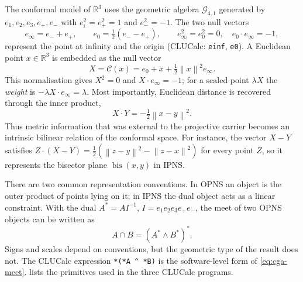 \documentclass[11pt,a4paper]{article}
\theoremstyle{plain}
\theoremstyle{definition}
\theoremstyle{remark}
\newcommand{\R}{\mathbb{R}}
\newcommand{\GA}{\mathcal{G}_{4,1}}
\newcommand{\einf}{e_{\infty}}
\newcommand{\ezero}{e_{0}}
\newcommand{\norm}[1]{\left\lVert#1\right\rVert}
\newcommand{\bis}{\operatorname{bis}}
\begin{document}
The conformal model of $\R^3$ uses the geometric algebra $\GA$ generated by
$e_1,e_2,e_3,e_{+},e_{-}$ with $e_i^2=e_{+}^2=1$ and $e_{-}^2=-1$. The two null
vectors
\begin{equation}
  \einf=e_{-}+e_{+},\qquad \ezero=\tfrac12(e_{-}-e_{+}),
  \qquad
  \einf^2=\ezero^2=0,\quad \ezero\cdot\einf=-1,
\end{equation}
represent the point at infinity and the origin (CLUCalc: \texttt{einf},
\texttt{e0}). A Euclidean point $x\in\R^3$ is embedded as the null vector
\begin{equation}
  X=\mathcal{C}(x)=\ezero+x+\tfrac{1}{2}\norm{x}^2\einf .
  \label{eq:conformal-embedding}
\end{equation}
This normalisation gives $X^2=0$ and $X\cdot\einf=-1$; for a scaled point
$\lambda X$ the \emph{weight} is $-\lambda X\cdot\einf=\lambda$. Most
importantly, Euclidean distance is recovered through the inner product,
\begin{equation}
  X\cdot Y=-\tfrac{1}{2}\norm{x-y}^2 .
  \label{eq:cga-distance}
\end{equation}
Thus metric information that was external to the projective carrier becomes an
intrinsic bilinear relation of the conformal space. For instance, the vector
$X-Y$ satisfies $Z\cdot(X-Y)=\frac12(\norm{z-y}^2-\norm{z-x}^2)$ for every point
$Z$, so it represents the bisector plane $\bis(x,y)$ in IPNS.

There are two common representation conventions. In OPNS an object is the outer
product of points lying on it; in IPNS the dual object acts as a linear
constraint. With the dual $A^*=AI^{-1}$, $I=e_1e_2e_3e_{+}e_{-}$, the meet of two
OPNS objects can be written as
\begin{equation}
  A\cap B=\left(A^*\wedge B^*\right)^* .
  \label{eq:cga-meet}
\end{equation}
Signs and scales depend on conventions, but the geometric type of the result
does not. The CLUCalc expression \texttt{*(*A \^{} *B)} is the software-level
form of \cref{eq:cga-meet}.  lists the primitives used
in the three CLUCalc programs.
\end{document}
